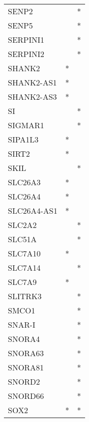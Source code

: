 \begin{longtable}{lcc}
SENP2            &                &          * \\
SENP5            &                &          * \\
SERPINI1         &                &          * \\
SERPINI2         &                &          * \\
SHANK2           &              * &            \\
SHANK2-AS1       &              * &            \\
SHANK2-AS3       &              * &            \\
SI               &                &          * \\
SIGMAR1          &                &          * \\
SIPA1L3          &              * &            \\
SIRT2            &              * &            \\
SKIL             &                &          * \\
SLC26A3          &              * &            \\
SLC26A4          &              * &            \\
SLC26A4-AS1      &              * &            \\
SLC2A2           &                &          * \\
SLC51A           &                &          * \\
SLC7A10          &              * &            \\
SLC7A14          &                &          * \\
SLC7A9           &              * &            \\
SLITRK3          &                &          * \\
SMCO1            &                &          * \\
SNAR-I           &                &          * \\
SNORA4           &                &          * \\
SNORA63          &                &          * \\
SNORA81          &                &          * \\
SNORD2           &                &          * \\
SNORD66          &                &          * \\
SOX2             &              * &          * \\

\end{longtable}
